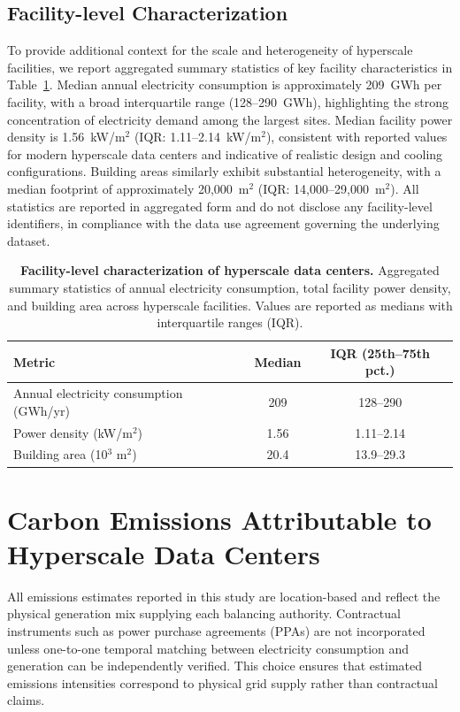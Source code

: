 \documentclass[12pt]{article}
\begin{document}
\subsection{Facility-level Characterization}\label{sm:s3_characterization}

To provide additional context for the scale and heterogeneity of hyperscale facilities, we report aggregated summary statistics of key facility characteristics in Table~\ref{tab:facility_characterization}. Median annual electricity consumption is approximately 209~GWh per facility, with a broad interquartile range (128–290~GWh), highlighting the strong concentration of electricity demand among the largest sites. 
Median facility power density is 1.56~kW/m$^{2}$ (IQR: 1.11–2.14~kW/m$^{2}$), consistent with reported values for modern hyperscale data centers and indicative of realistic design and cooling configurations. Building areas similarly exhibit substantial heterogeneity, with a median footprint of approximately 20,000~m$^{2}$ (IQR: 14,000–29,000~m$^{2}$). All statistics are reported in aggregated form and do not disclose any facility-level identifiers, in compliance with the data use agreement governing the underlying dataset.


\begin{table}[H]
\centering
\caption{\textbf{Facility-level characterization of hyperscale data centers.} 
Aggregated summary statistics of annual electricity consumption, total facility power 
density, and building area across hyperscale facilities. Values are reported as medians 
with interquartile ranges (IQR).}
\label{tab:facility_characterization}
\begin{tabular}{lcc}
\toprule
Metric & Median & IQR (25th--75th pct.) \\
\midrule
Annual electricity consumption (GWh/yr) & 209 & 128--290 \\
Power density (kW/m$^{2}$)               & 1.56 & 1.11--2.14 \\
Building area (10$^{3}$ m$^{2}$)         & 20.4 & 13.9--29.3 \\
\bottomrule
\end{tabular}
\end{table}


\section{Carbon Emissions Attributable to Hyperscale Data Centers}\label{sm:s4}
All emissions estimates reported in this study are location-based and reflect the physical generation mix supplying each balancing authority. Contractual instruments 
such as power purchase agreements (PPAs) are not incorporated unless one-to-one temporal matching between electricity consumption and generation can be independently 
verified. This choice ensures that estimated emissions intensities correspond to physical grid supply rather than contractual claims.
\end{document}
